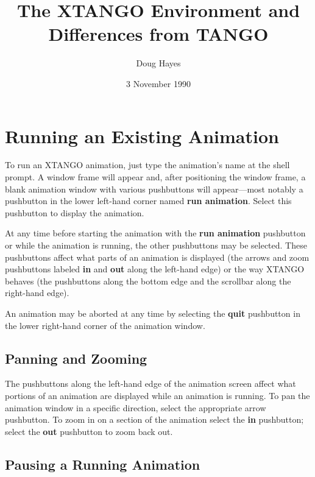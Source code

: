 
\title{The XTANGO Environment and Differences from TANGO}
\author{Doug Hayes}
\date{3 November 1990}

\textheight 9in
\textwidth 6.5in
\topmargin -0.5in
\oddsidemargin 0.0in
\evensidemargin 0.0in



\maketitle

\section{Running an Existing Animation}

To run an XTANGO animation, just type the animation's name at the shell
prompt.  A window frame will appear and, after positioning the window frame,
a blank animation window with various pushbuttons will appear---most
notably a pushbutton in the lower left-hand corner named {\bf run animation}.
Select this pushbutton to display the animation.

At any time before starting the animation with the {\bf run animation}
pushbutton or while the animation is running, the other pushbuttons may be
selected.  These pushbuttons affect what parts of an animation is
displayed (the arrows and zoom pushbuttons labeled {\bf in} and {\bf out}
along the left-hand edge) or the way XTANGO behaves (the pushbuttons
along the bottom edge and the scrollbar along the right-hand edge).

An animation may be aborted at any time by selecting the {\bf quit}
pushbutton in the lower right-hand corner of the animation window.

\subsection{Panning and Zooming}

The pushbuttons along the left-hand edge of the animation screen affect
what portions of an animation are displayed while an animation is running.
To pan the animation window in a specific direction, select the
appropriate arrow pushbutton.  To zoom in on a section of the animation
select the {\bf in} pushbutton; select the {\bf out} pushbutton to zoom back
out.

\subsection{Pausing a Running Animation}

